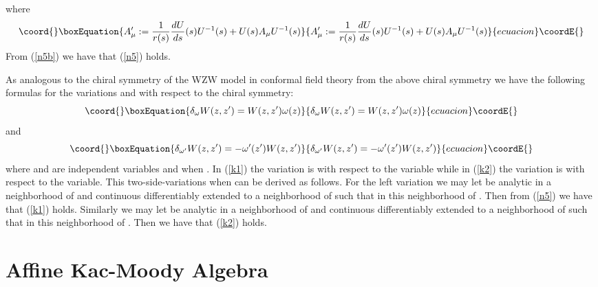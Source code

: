 \documentclass[a4paper,a4paper]{article}
\begin{document}
where 
\begin{equation}\coord{}\boxEquation{
A_{\mu}^{\prime}
:=\frac{1}{r(s)}\frac{dU}{ds}(s)U^{-1}(s)+
  U(s)A_{\mu}U^{-1}(s)
\label{n5c}
}{
A_{\mu}^{\prime}
:=\frac{1}{r(s)}\frac{dU}{ds}(s)U^{-1}(s)+
  U(s)A_{\mu}U^{-1}(s)
}{ecuacion}\coordE{}\end{equation}
From (\ref{n5b}) we have that (\ref{n5}) holds.


As analogous to the chiral symmetry of the WZW model in
conformal field theory \cite{Fra}
from the above chiral symmetry  we have the following formulas for the
variations \coordHE{} and \coordHE{} with
respect to the chiral symmetry:
\begin{equation}\coord{}\boxEquation{
\delta_{\omega}W(z,z')=W(z,z')\omega(z)
\label{k1}
}{
\delta_{\omega}W(z,z')=W(z,z')\omega(z)
}{ecuacion}\coordE{}\end{equation}
and
\begin{equation}\coord{}\boxEquation{
\delta_{\omega^{\prime}}W(z,z')=-\omega^{\prime}(z')W(z,z')
\label{k2}
}{
\delta_{\omega^{\prime}}W(z,z')=-\omega^{\prime}(z')W(z,z')
}{ecuacion}\coordE{}\end{equation}
where \coordHE{} and \coordHE{} are independent variables and
\coordHE{} when
\coordHE{}. In (\ref{k1}) the variation is with respect to the
\coordHE{} variable while in (\ref{k2}) the variation is with
respect to the \coordHE{} variable. This two-side-variations 
when \coordHE{} can be derived as follows.
For the left variation we may let \myHighlight{$\omega$}\coordHE{} be analytic
in a neighborhood of \coordHE{} and continuous differentiably extended to a neighborhood of \coordHE{}
such that \coordHE{} in this neighborhood of \coordHE{}. Then from (\ref{n5}) we have that
(\ref{k1}) holds. Similarly we may let
\myHighlight{$\omega^{\prime}$}\coordHE{} be analytic in a neighborhood of \coordHE{}
and continuous differentiably extended to a neighborhood of \coordHE{} such that \coordHE{} in this neighborhood of \coordHE{}. Then we have that
(\ref{k2}) holds.


\section{Affine Kac-Moody Algebra} \label{sec6}
\end{document}
